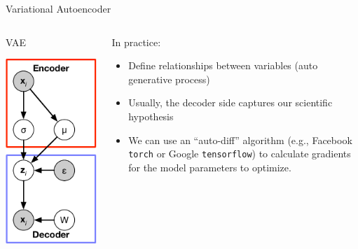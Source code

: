 \documentclass[
  ignorenonframetext,
  aspectratio=169]{beamer}
\begin{document}
\begin{frame}[fragile]{Variational Autoencoder}
\protect\hypertarget{variational-autoencoder-1}{}
\begin{columns}[T]
\begin{column}{.45\textwidth}
VAE

\scriptsize

\begin{center}\includegraphics[width=.5\linewidth]{./Vis/unsupervised/VAE_graphical_model} \end{center}

\normalsize
\end{column}

\begin{column}{.45\textwidth}
In practice:

\begin{itemize}
\item
  Define relationships between variables (auto generative process)
\item
  Usually, the decoder side captures our scientific hypothesis
\item
  We can use an ``auto-diff'' algorithm (e.g., Facebook \texttt{torch}
  or Google \texttt{tensorflow}) to calculate gradients for the model
  parameters to optimize.
\end{itemize}
\end{column}
\end{columns}

\scriptsize

\normalsize

\scriptsize

\normalsize

\scriptsize

\normalsize

\scriptsize

\normalsize

\scriptsize

\normalsize
\end{frame}
\end{document}

